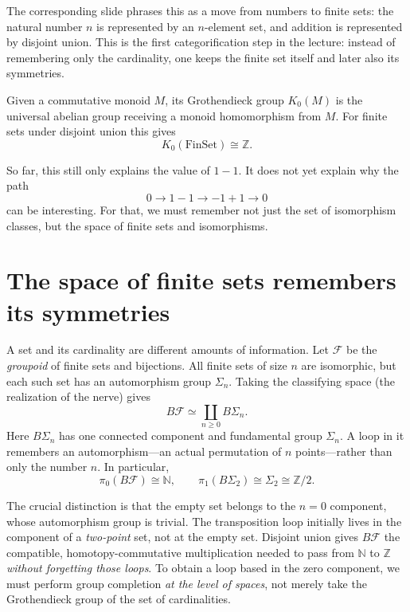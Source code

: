 \begin{remark}
The corresponding slide phrases this as a move from numbers to finite sets: the natural number \(n\) is represented by an \(n\)-element set, and addition is represented by disjoint union.  This is the first categorification step in the lecture: instead of remembering only the cardinality, one keeps the finite set itself and later also its symmetries.
\end{remark}


\begin{definition}
Given a commutative monoid \(M\), its Grothendieck group \(K_0(M)\) is the universal abelian group receiving a monoid homomorphism from \(M\).  For finite sets under disjoint union this gives
\[
  K_0(\mathrm{FinSet})\cong\mathbb Z.
\]
\end{definition}

So far, this still only explains the value of \(1-1\).  It does not yet explain why the path
\[
  0\to 1-1\to -1+1\to 0
\]
can be interesting.  For that, we must remember not just the set of isomorphism classes, but the space of finite sets and isomorphisms.

\section{The space of finite sets remembers its symmetries}

A set and its cardinality are different amounts of information. Let $\mathcal F$ be the \emph{groupoid} of finite sets and bijections. All finite sets of size $n$ are isomorphic, but each such set has an automorphism group $\Sigma_n$. Taking the classifying space (the realization of the nerve) gives
\[
 \boxed{B\mathcal F\simeq\coprod_{n\ge0}B\Sigma_n.}
\]
Here $B\Sigma_n$ has one connected component and fundamental group $\Sigma_n$. A loop in it remembers an automorphism---an actual permutation of $n$ points---rather than only the number $n$. In particular,
\[
 \pi_0(B\mathcal F)\cong\mathbb N,\qquad
 \pi_1(B\Sigma_2)\cong\Sigma_2\cong\mathbb Z/2.
\]

The crucial distinction is that the empty set belongs to the $n=0$ component, whose automorphism group is trivial. The transposition loop initially lives in the component of a \emph{two-point} set, not at the empty set. Disjoint union gives $B\mathcal F$ the compatible, homotopy-commutative multiplication needed to pass from $\mathbb N$ to $\mathbb Z$ \emph{without forgetting those loops}. To obtain a loop based in the zero component, we must perform group completion \emph{at the level of spaces}, not merely take the Grothendieck group of the set of cardinalities.


